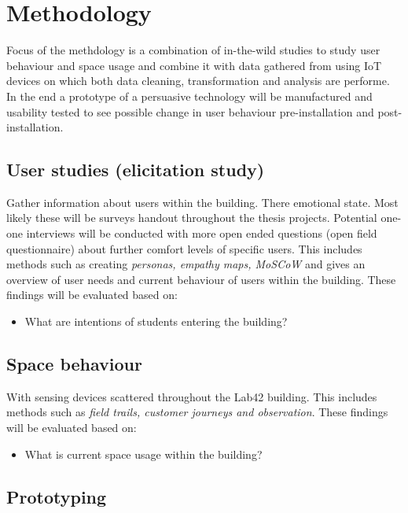 \section{Methodology}

Focus of the methdology is a combination of in-the-wild studies to study user behaviour and space usage and combine it with data gathered from using IoT devices on which both data cleaning, transformation and analysis are performe. In the end a prototype of a persuasive technology will be manufactured and usability tested to see possible change in user behaviour pre-installation and post-installation.

\subsection{User studies (elicitation study)}

Gather information about users within the building. There emotional state. Most likely these will be surveys handout throughout the thesis projects. Potential one-one interviews will be conducted with more open ended questions (open field questionnaire) about further comfort levels of specific users. This includes methods such as creating \emph{personas, empathy maps,  MoSCoW} and gives an overview of user needs and current behaviour of users within the building. These findings will be evaluated based on:

\begin{itemize}
  \item What are intentions of students entering the building?
\end{itemize}

\subsection{Space behaviour}

With sensing devices scattered throughout the Lab42 building. This includes methods such as \emph{field trails, customer journeys and observation}. These findings will be evaluated based on:

\begin{itemize}
  \item What is current space usage within the building?
\end{itemize}

\subsection{Prototyping}

